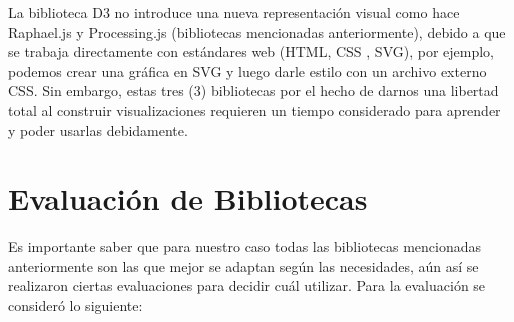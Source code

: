 La biblioteca D3 no introduce una nueva representación visual como hace Raphael.js y Processing.js (bibliotecas mencionadas anteriormente), debido a que se trabaja directamente con estándares web (HTML, CSS \cite{MozCSS}, SVG), por ejemplo, podemos crear una gráfica en SVG y luego darle estilo con un archivo externo CSS. Sin embargo, estas tres (3) bibliotecas por el hecho de darnos una libertad total al construir visualizaciones requieren un tiempo considerado para aprender y poder usarlas debidamente.
\\[15pt]
\section{Evaluación de Bibliotecas}
Es importante saber que para nuestro caso todas las bibliotecas mencionadas anteriormente son las que mejor se adaptan según las necesidades, aún así se realizaron ciertas evaluaciones para decidir cuál utilizar. Para la evaluación se consideró lo siguiente:

